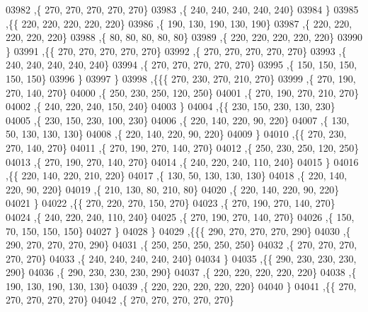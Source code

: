\begin{DoxyCode}
03982     ,\{   270,   270,   270,   270,   270\}
03983     ,\{   240,   240,   240,   240,   240\}
03984     \}
03985    ,\{\{   220,   220,   220,   220,   220\}
03986     ,\{   190,   130,   190,   130,   190\}
03987     ,\{   220,   220,   220,   220,   220\}
03988     ,\{    80,    80,    80,    80,    80\}
03989     ,\{   220,   220,   220,   220,   220\}
03990     \}
03991    ,\{\{   270,   270,   270,   270,   270\}
03992     ,\{   270,   270,   270,   270,   270\}
03993     ,\{   240,   240,   240,   240,   240\}
03994     ,\{   270,   270,   270,   270,   270\}
03995     ,\{   150,   150,   150,   150,   150\}
03996     \}
03997    \}
03998   ,\{\{\{   270,   230,   270,   210,   270\}
03999     ,\{   270,   190,   270,   140,   270\}
04000     ,\{   250,   230,   250,   120,   250\}
04001     ,\{   270,   190,   270,   210,   270\}
04002     ,\{   240,   220,   240,   150,   240\}
04003     \}
04004    ,\{\{   230,   150,   230,   130,   230\}
04005     ,\{   230,   150,   230,   100,   230\}
04006     ,\{   220,   140,   220,    90,   220\}
04007     ,\{   130,    50,   130,   130,   130\}
04008     ,\{   220,   140,   220,    90,   220\}
04009     \}
04010    ,\{\{   270,   230,   270,   140,   270\}
04011     ,\{   270,   190,   270,   140,   270\}
04012     ,\{   250,   230,   250,   120,   250\}
04013     ,\{   270,   190,   270,   140,   270\}
04014     ,\{   240,   220,   240,   110,   240\}
04015     \}
04016    ,\{\{   220,   140,   220,   210,   220\}
04017     ,\{   130,    50,   130,   130,   130\}
04018     ,\{   220,   140,   220,    90,   220\}
04019     ,\{   210,   130,    80,   210,    80\}
04020     ,\{   220,   140,   220,    90,   220\}
04021     \}
04022    ,\{\{   270,   220,   270,   150,   270\}
04023     ,\{   270,   190,   270,   140,   270\}
04024     ,\{   240,   220,   240,   110,   240\}
04025     ,\{   270,   190,   270,   140,   270\}
04026     ,\{   150,    70,   150,   150,   150\}
04027     \}
04028    \}
04029   ,\{\{\{   290,   270,   270,   270,   290\}
04030     ,\{   290,   270,   270,   270,   290\}
04031     ,\{   250,   250,   250,   250,   250\}
04032     ,\{   270,   270,   270,   270,   270\}
04033     ,\{   240,   240,   240,   240,   240\}
04034     \}
04035    ,\{\{   290,   230,   230,   230,   290\}
04036     ,\{   290,   230,   230,   230,   290\}
04037     ,\{   220,   220,   220,   220,   220\}
04038     ,\{   190,   130,   190,   130,   130\}
04039     ,\{   220,   220,   220,   220,   220\}
04040     \}
04041    ,\{\{   270,   270,   270,   270,   270\}
04042     ,\{   270,   270,   270,   270,   270\}

\end{DoxyCode}
